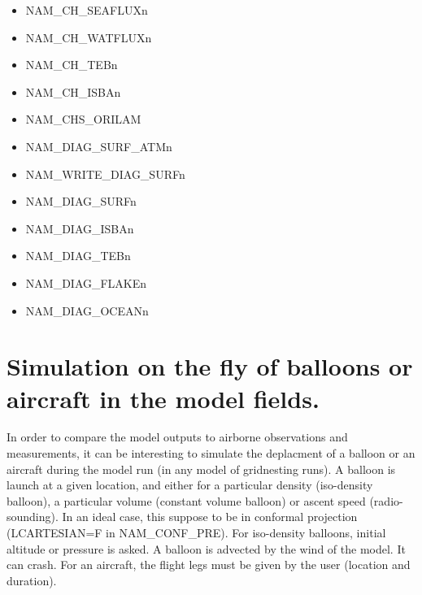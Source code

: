 \begin{itemize}
\item NAM\_CH\_SEAFLUXn
\item NAM\_CH\_WATFLUXn
\item NAM\_CH\_TEBn
\item NAM\_CH\_ISBAn
\item NAM\_CHS\_ORILAM
\item NAM\_DIAG\_SURF\_ATMn
\item NAM\_WRITE\_DIAG\_SURFn
\item NAM\_DIAG\_SURFn
\item NAM\_DIAG\_ISBAn
\item NAM\_DIAG\_TEBn
\item NAM\_DIAG\_FLAKEn
\item NAM\_DIAG\_OCEANn
\end{itemize}






\section{Simulation on the fly of balloons or aircraft in the model fields.}
\label{ss:balloon}

In order to compare the model outputs to airborne observations
and measurements, it can be interesting to simulate the deplacment of a
balloon or an aircraft during the model run (in any model of
gridnesting runs). A balloon is launch at
a given location, and either for a particular density (iso-density balloon),
a particular volume (constant volume balloon)
or ascent speed (radio-sounding). In an ideal case, this suppose to be in conformal projection 
(LCARTESIAN=F in NAM\_CONF\_PRE).
For iso-density balloons, initial 
altitude or pressure is asked. A balloon is advected by the wind of the
model. It can crash. For an aircraft, the flight
legs must be given by the user (location and duration). 

